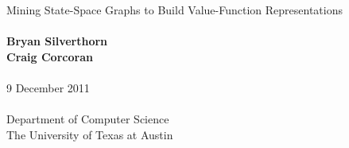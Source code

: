 \documentclass{beamer}
\begin{document}

\begin{frame}[plain]
\begin{center}
{\LARGE Mining State-Space Graphs to Build Value-Function Representations}
\ \\
\ \\
{\bf Bryan Silverthorn\\Craig Corcoran}
\ \\
\ \\
9 December 2011
\ \\
\ \\
Department of Computer Science\\
The University of Texas at Austin
\end{center}
\end{frame}



%
%
%
\end{document}
